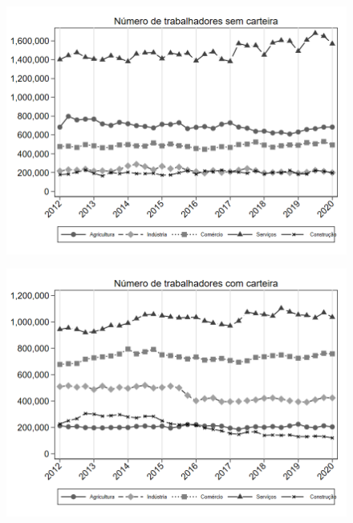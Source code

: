 \begin{frame}[label=_composicao_demografica_setor_n_empregadoSC]{}
\textit{\hyperlink{_composicao_demografica_setor}{}}
\begin{figure}
  \centering
  \includegraphics[width=1.0\linewidth]{../../analysis/output/composicao_demografica/setor/_composicao_demografica_setor_n_empregadoSC.png}
  \caption{}
  \label{fig:_composicao_demografica_setor_n_empregadoSC}
\end{figure}
\end{frame}

\begin{frame}[label=_composicao_demografica_setor_n_empregadoCC]{}
\textit{\hyperlink{_composicao_demografica_setor}{}}
\begin{figure}
  \centering
  \includegraphics[width=1.0\linewidth]{../../analysis/output/composicao_demografica/setor/_composicao_demografica_setor_n_empregadoCC.png}
  \caption{}
  \label{fig:_composicao_demografica_setor_n_empregadoCC}
\end{figure}
\end{frame}

